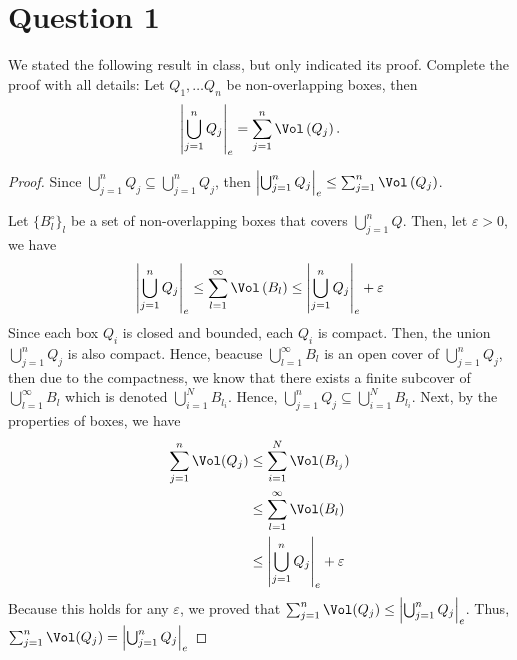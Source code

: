 \section{Question 1}

\begin{question}
    We stated the following result in class, but only indicated its proof. Complete the proof with all details: Let $Q_1, \ldots Q_n$ be non-overlapping boxes, then
    $$
        \left|\bigcup_{j=1}^n Q_j\right|_e=\sum_{j=1}^n \Vol\left(Q_j\right) .
    $$
\end{question}

\begin{answer}
    \begin{proof}
        Since $\bigcup_{j=1}^nQ_j \subseteq \bigcup_{j=1}^nQ_j$, then $\left \lvert \bigcup_{j = 1}^n Q_j\right\rvert_e \leq \sum_{j=1}^n \Vol\left(Q_j\right)$.
        
        Let $\{B_l^{\circ}\}_l$ be a set of non-overlapping boxes that covers $\bigcup_{j = 1}^n Q$. Then, let $\varepsilon > 0$, we have
        $$\left|\bigcup_{j=1}^n Q_j\right|_e \leq \sum_{l=1}^{\infty} \Vol\left(B_l\right) \leq \left|\bigcup_{j=1}^n Q_j\right|_e + \varepsilon$$
        Since each box $Q_i$ is closed and bounded, each $Q_i$ is compact. Then, the union $\bigcup_{j=1}^n Q_j$ is also compact. Hence, beacuse $\bigcup_{l = 1}^{\infty}B_l$ is an open cover of $\bigcup_{j=1}^n Q_j$, then due to the compactness, we know that there exists a finite subcover of $\bigcup_{l = 1}^{\infty}B_l$ which is denoted $\bigcup_{i = 1}^{N}B_{l_i}$. Hence, $\bigcup_{j=1}^n Q_j \subseteq \bigcup_{i = 1}^{N}B_{l_i}$. Next, by the properties of boxes, we have
        $$
            \begin{aligned}
                \sum_{j = 1}^n\Vol (Q_j) &\leq \sum_{i = 1}^N\Vol (B_{l_j})\\
                &\leq \sum_{l = 1}^{\infty}\Vol (B_l)\\
                &\leq \left|\bigcup_{j=1}^n Q_j\right|_e + \varepsilon
            \end{aligned}
        $$
        Because this holds for any $\varepsilon$, we proved that $\sum_{j = 1}^n\Vol (Q_j) \leq \left|\bigcup_{j=1}^n Q_j\right|_e$. Thus, $\sum_{j = 1}^n\Vol (Q_j) = \left|\bigcup_{j=1}^n Q_j\right|_e$
    \end{proof}
\end{answer}
